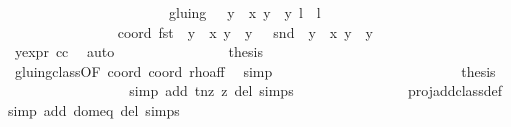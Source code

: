 \begin{isabellebody}
\ \ \ \ \ \ \ \ \ \ \ \ \ \ \ \ \ \ \ \ \ \ {\isacharequal}\ gluing\ {\isacharbackquote}{\isacharbackquote}\ {\isacharbraceleft}{\isacharparenleft}{\isasymrho}\ {\isacharparenleft}y\ {\isacharasterisk}\ x{\isacharprime}{\isacharcomma}\ y\ {\isacharasterisk}\ y{\isacharprime}{\isacharparenright}{\isacharcomma}\ l\ {\isacharplus}\ l{\isacharprime}{\isacharparenright}{\isacharbraceright}{\isachardoublequoteclose}\isanewline
\ \ \ \ \ \ \ \ \ \ \ \ \isamarkupfalse%
\ {\isacharminus}\isanewline
\ \ \ \ \ \ \ \ \ \ \ \ \ \ \isamarkupfalse%
\ coord{\isacharcolon}\ {\isachardoublequoteopen}fst\ {\isacharparenleft}{\isasymrho}\ {\isacharparenleft}y\ {\isacharasterisk}\ x{\isacharprime}{\isacharcomma}\ y\ {\isacharasterisk}\ y{\isacharprime}{\isacharparenright}{\isacharparenright}\ {\isasymnoteq}\ {}{\isachardoublequoteclose}\ {\isachardoublequoteopen}snd\ {\isacharparenleft}{\isasymrho}\ {\isacharparenleft}y\ {\isacharasterisk}\ x{\isacharprime}{\isacharcomma}\ y\ {\isacharasterisk}\ y{\isacharprime}{\isacharparenright}{\isacharparenright}\ {\isasymnoteq}\ {}{\isachardoublequoteclose}\ \isanewline
\ \ \ \ \ \ \ \ \ \ \ \ \ \ \ \ \isamarkupfalse%
\ y{\isacharunderscore}expr\ cc\ \isamarkupfalse%
\ auto\isanewline
\ \ \ \ \ \ \ \ \ \ \ \ \ \ \isamarkupfalse%
\ {\isacharquery}thesis\isanewline
\ \ \ \ \ \ \ \ \ \ \ \ \ \ \ \ \isamarkupfalse%
\ gluing{\isacharunderscore}class{\isacharbrackleft}OF\ coord{\isacharparenleft}{}{\isacharparenright}\ coord{\isacharparenleft}{}{\isacharparenright}{\isacharbrackright}\ rho{\isacharunderscore}aff\ \isamarkupfalse%
\ simp\isanewline
\ \ \ \ \ \ \ \ \ \ \ \ \isamarkupfalse%
\isanewline
\ \ \ \ \ \ \ \ \ \ \ \ \isamarkupfalse%
\ {\isacharquery}thesis\isanewline
\ \ \ \ \ \ \ \ \ \ \ \ \ \ \isamarkupfalse%
\ {}\ \isamarkupfalse%
{\isacharparenleft}simp\ add{\isacharcolon}\ t{\isacharunderscore}nz\ z{}\ del{\isacharcolon}\ {\isasymtau}{\isachardot}simps{\isacharparenright}\isanewline
\ \ \ \ \ \ \ \ \ \ \ \ \ \ \isamarkupfalse%
\ proj{\isacharunderscore}add{\isacharunderscore}class{\isacharunderscore}def\ \isamarkupfalse%
{\isacharparenleft}simp\ add{\isacharcolon}\ dom{\isacharunderscore}eq\ del{\isacharcolon}\ {\isasymtau}{\isachardot}simps{\isacharparenright}\isanewline
\ \ \ \ \ \ \ \ \ \ \ \ \ \ \isamarkupfalse%

\end{isabellebody}
